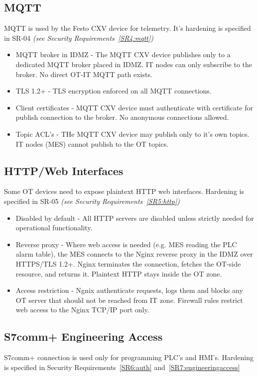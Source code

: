 \documentclass{report}
\begin{document}
\subsection{MQTT}
MQTT is used by the Festo CXV device for telemetry. It's hardening is specified in SR-04 \textit{(see Security Requirements~\ref{SR4:mqtt})}

\begin{itemize}
    \item MQTT broker in IDMZ - The MQTT CXV device publishes only to a dedicated MQTT broker placed in IDMZ. IT nodes can only subscribe to the broker. No direct OT-IT MQTT path exists.
    \item TLS 1.2+ - TLS encryption enforced on all MQTT connections.
    \item Client certificates - MQTT CXV device must authenticate with certificate for publish connection to the broker. No anonymous connections allowed.
    \item Topic ACL's - THe MQTT CXV device may publish only to it's own topics. IT nodes (MES) cannot publish to the OT topics.
\end{itemize}

\subsection{HTTP/Web Interfaces}
Some OT devices need to expose plaintext HTTP web interfaces. Hardening is specified in SR-05 \textit{(see Security Requirements~\ref{SR5:http})}

\begin{itemize}
    \item Disabled by default - All HTTP servers are disabled unless strictly needed for operational functionality.
    \item Reverse proxy - Where web access is needed (e.g. MES reading the PLC alarm table), the MES connects to the Nginx reverse proxy in the IDMZ over HTTPS/TLS 1.2+. Nginx terminates the connection, fetches the OT-side resource, and returns it. Plaintext HTTP stays inside the OT zone.
    \item Access restriction - Ngnix authenticate requests, logs them and blocks any OT server that should not be reached from IT zone. Firewall rules restrict web access to the Nginx TCP/IP port only.
\end{itemize}

\subsection{S7comm+ Engineering Access}
S7comm+ connection is used only for programming PLC's and HMI's. Hardening is specified in Security Requirements~\ref{SR6:auth} and~\ref{SR7:engineeringaccess}
\end{document}
